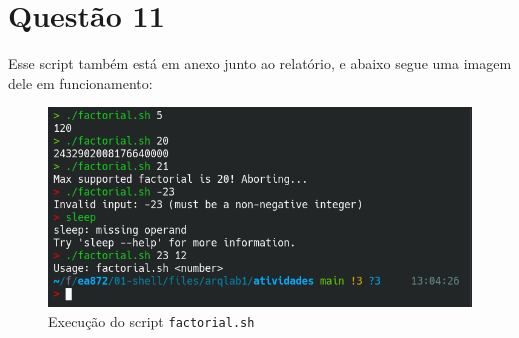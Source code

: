\documentclass{article}
\begin{document}
\section*{Questão 11}

Esse script também está em anexo junto ao relatório, e abaixo segue uma imagem dele em funcionamento:

\begin{figure}[!ht]
    \begin{center}
        \includegraphics[width=\textwidth]{images/q11_exec.png}
        \caption{Execução do script \texttt{factorial.sh}}
    \end{center}
\end{figure}
\end{document}
